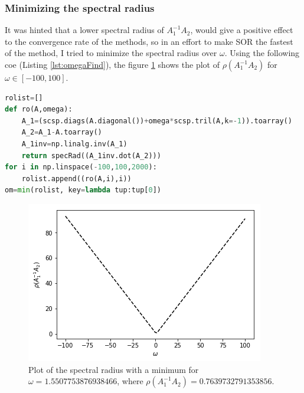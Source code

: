 \documentclass[12pt, a4paper,usenames,dvipsnames]{article}
\begin{document}
\subsubsection*{Minimizing the spectral radius}
It was hinted that a lower spectral radius of \(A_1^{-1}A_2\), would give a positive effect to the convergence rate of the methods, so in an effort to make SOR the fastest of the method, I tried to minimize the spectral radius over \(\omega\). Using the following coe (Listing \ref{lst:omegaFind}), the figure \ref{fig:spec} shows the plot of  \(\rho(A_1^{-1}A_2)\) for \(\omega \in [-100,100]\).
\begin{lstlisting}[language=python,caption=Minimizing \(\rho(A_1^{-1}A_2)\) over \(\omega\).,label=lst:omegaFind]
rolist=[]
def ro(A,omega):
    A_1=(scsp.diags(A.diagonal())+omega*scsp.tril(A,k=-1)).toarray()
    A_2=A_1-A.toarray()
    A_1inv=np.linalg.inv(A_1)
    return specRad((A_1inv.dot(A_2)))
for i in np.linspace(-100,100,2000):
    rolist.append((ro(A,i),i))
om=min(rolist, key=lambda tup:tup[0])
\end{lstlisting}
\begin{figure}[h!]
    \centering
    \includegraphics[width=\linewidth]{ro.png}
    \caption{Plot of the spectral radius with a minimum for \(\omega=1.5507753876938466\), where \(\rho(A_1^{-1}A_2)=0.7639732791353856\).}
    \label{fig:spec}
\end{figure}
\end{document}
